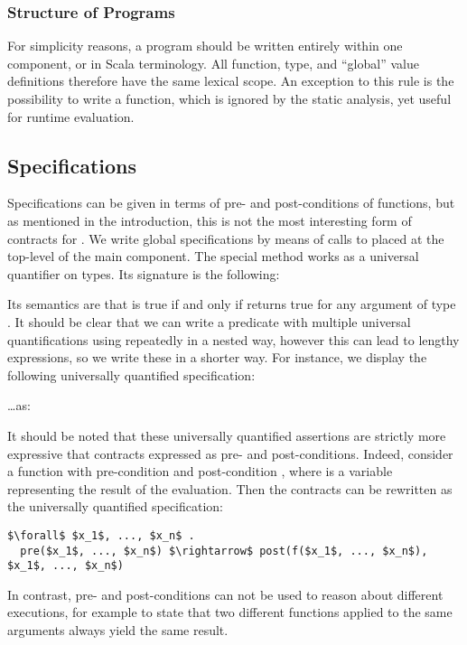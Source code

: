 \subsubsection{Structure of Programs}
For simplicity reasons, a {\purescala} program should be written entirely
within one component, or  in Scala terminology. All function, type,
and ``global'' value definitions therefore have the same lexical scope. An
exception to this rule is the possibility to write a  function, which
is ignored by the static analysis, yet useful for runtime evaluation.

\subsection{Specifications}
Specifications can be given in terms of pre- and post-conditions of functions,
but as mentioned in the introduction, this is not the most interesting form of
contracts for {\purescala}. We write global specifications by means of calls to
 placed at the top-level of the main component. The special method  works as a universal quantifier on {\purescala} types. Its signature is the following:



Its semantics are that  is true if and
only if  returns true for any argument of type . It should be clear that we can write a predicate with multiple universal quantifications using  repeatedly in a nested way, however this can lead to lengthy expressions, so we write these in a shorter way. For instance, we display the following universally quantified specification:



\ldots as:



It should be noted that these universally quantified assertions are strictly
more expressive that contracts expressed as pre- and post-conditions. Indeed,
consider a function  with pre-condition  and post-condition , where  is a variable representing the result of the evaluation. Then the contracts can be rewritten as the universally quantified specification:

\begin{lstlisting}
$\forall$ $x_1$, ..., $x_n$ . 
  pre($x_1$, ..., $x_n$) $\rightarrow$ post(f($x_1$, ..., $x_n$), $x_1$, ..., $x_n$)
\end{lstlisting}

In contrast, pre- and post-conditions can not be used to reason about different
executions, for example to state that two different functions applied to the
same arguments always yield the same result.
